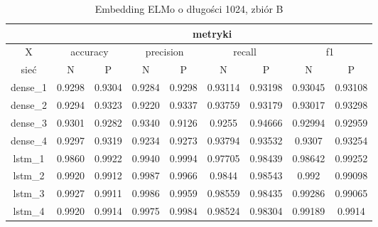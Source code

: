 \begin{table}[p] \label{tab:wyniki_elmo_B} \centering
    \caption{Embedding ELMo o długości 1024, zbiór B}
    \begin{tabular} {|c|c|c|c|c|c|c|c|c| }    \hline
                 & \multicolumn{8}{c|}{metryki}                                                                                                                                   \\ \hline
        X        & \multicolumn{2}{c|}{accuracy} & \multicolumn{2}{c|}{precision} & \multicolumn{2}{c|}{recall} & \multicolumn{2}{c|}{f1}                                         \\ \hline
        sieć     & N                             & P                              & N                           & P                       & N       & P       & N       & P       \\ \hline
        dense\_1 & 0.9298                        & 0.9304                         & 0.9284                      & 0.9298                  & 0.93114 & 0.93198 & 0.93045 & 0.93108 \\ \hline
        dense\_2 & 0.9294                        & 0.9323                         & 0.9220                      & 0.9337                  & 0.93759 & 0.93179 & 0.93017 & 0.93298 \\ \hline
        dense\_3 & 0.9301                        & 0.9282                         & 0.9340                      & 0.9126                  & 0.9255  & 0.94666 & 0.92994 & 0.92959 \\ \hline
        dense\_4 & 0.9297                        & 0.9319                         & 0.9234                      & 0.9273                  & 0.93794 & 0.93532 & 0.9307  & 0.93254 \\ \hline
        lstm\_1  & 0.9860                        & 0.9922                         & 0.9940                      & 0.9994                  & 0.97705 & 0.98439 & 0.98642 & 0.99252 \\ \hline
        lstm\_2  & 0.9920                        & 0.9912                         & 0.9987                      & 0.9966                  & 0.9844  & 0.98543 & 0.992   & 0.99098 \\ \hline
        lstm\_3  & 0.9927                        & 0.9911                         & 0.9986                      & 0.9959                  & 0.98559 & 0.98435 & 0.99286 & 0.99065 \\ \hline
        lstm\_4  & 0.9920                        & 0.9914                         & 0.9975                      & 0.9984                  & 0.98524 & 0.98304 & 0.99189 & 0.9914  \\ \hline

\end{tabular}
\end{table}
